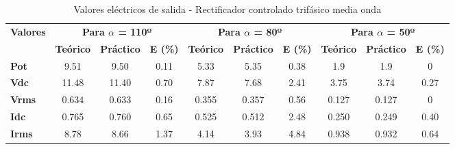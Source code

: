 \begin{table}[h]
	\centering
	\begin{tabular}{|l|ccc|ccc|ccc|}
		\hline
		\multicolumn{1}{|c|}{\multirow{2}{*}{\textbf{Valores}}} & \multicolumn{3}{c|}{\textbf{Para $\alpha$ = 110º}}                                                      & \multicolumn{3}{c|}{\textbf{Para $\alpha$ = 80º}}                                                       & \multicolumn{3}{c|}{\textbf{Para $\alpha$ = 50º}}                                                       \\ \cline{2-10} 
		\multicolumn{1}{|c|}{}                                  & \multicolumn{1}{c|}{\textbf{Teórico}} & \multicolumn{1}{c|}{\textbf{Práctico}} & \textbf{E (\%)} & \multicolumn{1}{c|}{\textbf{Teórico}} & \multicolumn{1}{c|}{\textbf{Práctico}} & \textbf{E (\%)} & \multicolumn{1}{c|}{\textbf{Teórico}} & \multicolumn{1}{c|}{\textbf{Práctico}} & \textbf{E (\%)} \\ \hline
		\textbf{Pot}                                       & \multicolumn{1}{c|}{9.51}             & \multicolumn{1}{c|}{9.50}              & 0.11                & \multicolumn{1}{c|}{5.33}             & \multicolumn{1}{c|}{5.35}              & 0.38                & \multicolumn{1}{c|}{1.9}              & \multicolumn{1}{c|}{1.9}               & 0                   \\ \hline
		\textbf{Vdc}                                         & \multicolumn{1}{c|}{11.48}            & \multicolumn{1}{c|}{11.40}             & 0.70                & \multicolumn{1}{c|}{7.87}             & \multicolumn{1}{c|}{7.68}              & 2.41                & \multicolumn{1}{c|}{3.75}             & \multicolumn{1}{c|}{3.74}              & 0.27                \\ \hline
		\textbf{Vrms}                                           & \multicolumn{1}{c|}{0.634}            & \multicolumn{1}{c|}{0.633}             & 0.16                & \multicolumn{1}{c|}{0.355}            & \multicolumn{1}{c|}{0.357}             & 0.56                & \multicolumn{1}{c|}{0.127}            & \multicolumn{1}{c|}{0.127}             & 0                   \\ \hline
		\textbf{Idc}                                         & \multicolumn{1}{c|}{0.765}            & \multicolumn{1}{c|}{0.760}             & 0.65                & \multicolumn{1}{c|}{0.525}            & \multicolumn{1}{c|}{0.512}             & 2.48                & \multicolumn{1}{c|}{0.250}            & \multicolumn{1}{c|}{0.249}             & 0.40                \\ \hline
		\textbf{Irms}                                           & \multicolumn{1}{c|}{8.78}             & \multicolumn{1}{c|}{8.66}              & 1.37                & \multicolumn{1}{c|}{4.14}             & \multicolumn{1}{c|}{3.93}              & 4.84                & \multicolumn{1}{c|}{0.938}            & \multicolumn{1}{c|}{0.932}             & 0.64                \\ \hline
	\end{tabular}
	\caption{Valores eléctricos de salida - Rectificador controlado trifásico media onda}
	\label{tab:valores-salida-rect}
\end{table}


